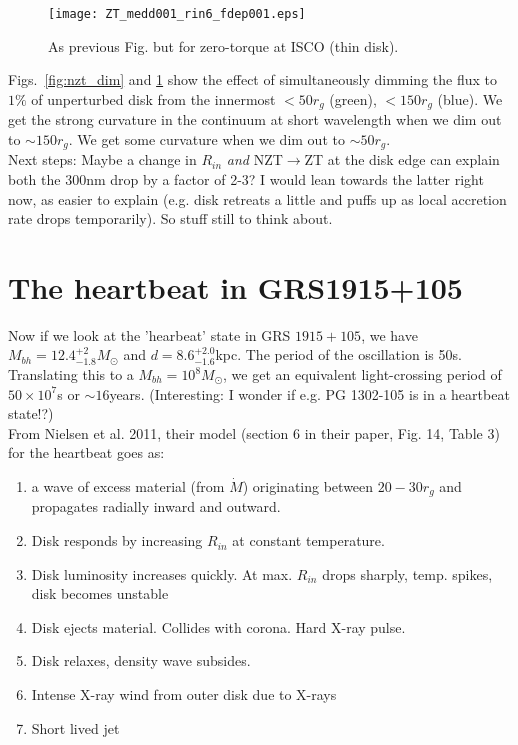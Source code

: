 \documentclass[12pt]{article}
\begin{document}
\begin{figure}
\begin{center}
\texttt{[image: ZT\_medd001\_rin6\_fdep001.eps]}
\end{center}
\caption[cartoon]{
As previous Fig. but for zero-torque at ISCO (thin disk).
\label{fig:zt_dim}}
\end{figure}

Figs.~\ref{fig:nzt_dim} and \ref{fig:zt_dim} show the effect of simultaneously dimming the flux to $1\%$ of unperturbed disk from the innermost $<50r_{g}$ (green), $<150r_{g}$ (blue). We get the strong curvature in the continuum at short wavelength when we dim out to $\sim 150r_{g}$. We get some curvature when we dim out to $\sim 50r_{g}$.\\
Next steps: Maybe a change in $R_{in}$ \emph{and} NZT$\rightarrow$ZT at the disk edge can explain both the 300nm drop by a factor of 2-3? I would lean towards the latter right now, as easier to explain (e.g. disk retreats a little and puffs up as local accretion rate drops temporarily). So stuff still to think about.\\

\section{The heartbeat in GRS1915+105}

Now if we look at the 'hearbeat' state in GRS $1915+105$, we have $M_{bh}=12.4^{+2}_{-1.8}M_{\odot}$ and $d=8.6^{+2.0}_{-1.6}$kpc. The period of the oscillation is 50s. Translating this to a $M_{bh}=10^{8}M_{\odot}$, we get an equivalent light-crossing period of $50 \times 10^{7}$s or $\sim 16$years. (Interesting: I wonder if e.g. PG 1302-105 is in a heartbeat state!?)\\

From Nielsen et al. 2011, their model (section 6 in their paper, Fig. 14, Table 3) for the heartbeat goes as: 
\begin{enumerate}
\item{a wave of excess material (from $\dot{M}$) originating between $20-30r_{g}$ and propagates radially inward and outward.}
\item{Disk responds by increasing $R_{in}$ at constant temperature.}
\item{Disk luminosity increases quickly. At max. $R_{in}$ drops sharply, temp. spikes, disk becomes unstable}
\item{Disk ejects material. Collides with corona. Hard X-ray pulse.}
\item{Disk relaxes, density wave subsides.}
\item{Intense X-ray wind from outer disk due to X-rays}
\item{Short lived jet}

\end{enumerate}
\end{document}
